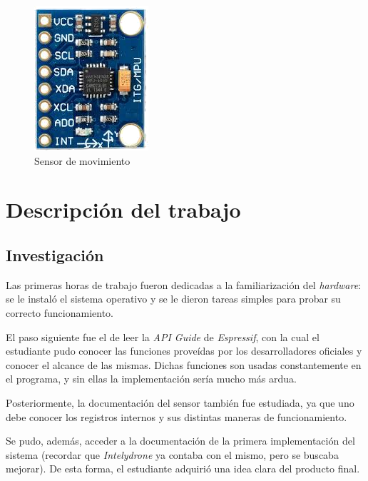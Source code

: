 \documentclass{article}
\begin{document}
    \begin{figure}[h]
        \includegraphics[width=0.3 \textwidth, center]{../primeras/mpu.png}
        \caption{Sensor de movimiento}
        \label{fig:mpu}
    \end{figure} 


    \newpage
    \section{Descripción del trabajo}   

    \subsection{Investigación}
    Las primeras horas de trabajo fueron dedicadas a la familiarización del 
    \emph{hardware}: se le instaló el sistema operativo y se le dieron tareas
    simples para probar su correcto funcionamiento. \par
    El paso siguiente fue el de leer la \emph{API Guide} de \emph{Espressif}, 
    con la cual el estudiante pudo conocer las funciones proveídas por los 
    desarrolladores oficiales y conocer el alcance de las mismas. Dichas 
    funciones son usadas constantemente en el programa, y sin ellas la 
    implementación sería mucho más ardua. \par
    Posteriormente, la documentación del sensor también fue estudiada, ya que 
    uno debe conocer los registros internos y sus distintas maneras de 
    funcionamiento. \par
    Se pudo, además, acceder a la documentación de la primera implementación
    del sistema (recordar que \emph{Intelydrone} ya contaba con el mismo, pero 
    se buscaba mejorar). De esta forma, el estudiante adquirió una idea clara 
    del producto final. \newline \par
\end{document}
